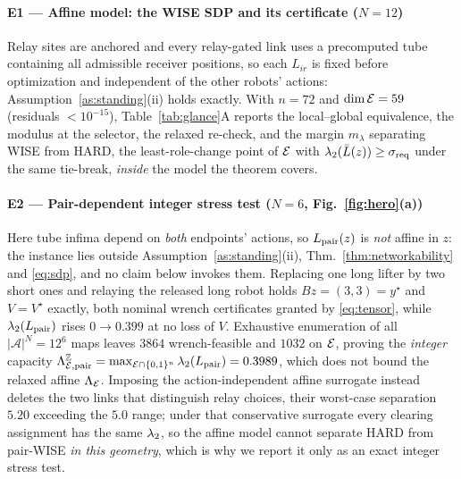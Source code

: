 \paragraph*{E1 --- Affine model: the WISE SDP and its certificate ($N{=}12$)}
Relay sites are anchored and every relay-gated link uses a precomputed tube containing all
admissible receiver positions, so each $L_{ir}$ is fixed before optimization and independent of
the other robots' actions: Assumption~\ref{as:standing}(ii) holds exactly. With
$n=72$ and $\dim\mathcal{E}=59$ (residuals $<10^{-15}$), Table~\ref{tab:glance}A reports the
local--global equivalence, the modulus at the selector, the relaxed re-check, and the margin
$m_\lambda$ separating WISE from HARD, the least-role-change point of $\mathcal{E}$ with
$\lambda_2(\bar L(z))\ge\sigma_{\mathrm{req}}$ under the same tie-break, \emph{inside} the model the theorem
covers.

\paragraph*{E2 --- Pair-dependent integer stress test ($N{=}6$, Fig.~\ref{fig:hero}(a))}
Here tube infima depend on \emph{both} endpoints' actions, so $L_{\mathrm{pair}}(z)$ is \emph{not} affine
in $z$: the instance lies outside Assumption~\ref{as:standing}(ii),
Thm.~\ref{thm:networkability} and \eqref{eq:sdp}, and no claim below invokes them. Replacing
one long lifter by two short ones and relaying the released long robot holds
$Bz=(3,3)=y^{\star}$ and $V=V^{\star}$ exactly, both nominal wrench certificates granted by
\eqref{eq:tensor}, while $\lambda_2(L_{\mathrm{pair}})$ rises $0\to0.399$ at no loss of $V$. Exhaustive enumeration of all $|\mathcal A|^N=12^6$ maps leaves $3864$ wrench-feasible and
$1032$ on $\mathcal{E}$, proving the \emph{integer} capacity
$\Lambda^{\mathbb Z}_{\mathcal{E},\mathrm{pair}}
=\max_{\mathcal{E}\cap\{0,1\}^n}\lambda_2(L_{\mathrm{pair}})=0.3989$, which does not bound the relaxed affine
$\Lambda_{\mathcal{E}}$. Imposing the action-independent affine surrogate instead deletes the two links that
distinguish relay choices, their worst-case separation $5.20$ exceeding the $5.0$ range; under
that conservative surrogate every clearing assignment has the same $\lambda_2$, so the affine
model cannot separate HARD from pair-WISE \emph{in this geometry}, which is why we report it
only as an exact integer stress test.

